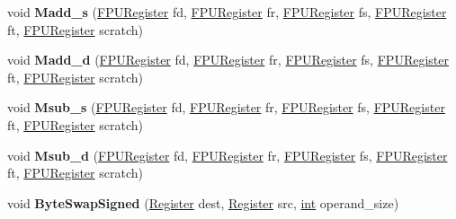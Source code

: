 \begin{DoxyCompactItemize}
void {\bfseries Madd\+\_\+s} (\mbox{\hyperlink{classv8_1_1internal_1_1FPURegister}{F\+P\+U\+Register}} fd, \mbox{\hyperlink{classv8_1_1internal_1_1FPURegister}{F\+P\+U\+Register}} fr, \mbox{\hyperlink{classv8_1_1internal_1_1FPURegister}{F\+P\+U\+Register}} fs, \mbox{\hyperlink{classv8_1_1internal_1_1FPURegister}{F\+P\+U\+Register}} ft, \mbox{\hyperlink{classv8_1_1internal_1_1FPURegister}{F\+P\+U\+Register}} scratch)
\item 
\mbox{\label{classv8_1_1internal_1_1TurboAssembler_a2dcf753d42d05104e154446ae83acad6}} 
void {\bfseries Madd\+\_\+d} (\mbox{\hyperlink{classv8_1_1internal_1_1FPURegister}{F\+P\+U\+Register}} fd, \mbox{\hyperlink{classv8_1_1internal_1_1FPURegister}{F\+P\+U\+Register}} fr, \mbox{\hyperlink{classv8_1_1internal_1_1FPURegister}{F\+P\+U\+Register}} fs, \mbox{\hyperlink{classv8_1_1internal_1_1FPURegister}{F\+P\+U\+Register}} ft, \mbox{\hyperlink{classv8_1_1internal_1_1FPURegister}{F\+P\+U\+Register}} scratch)
\item 
\mbox{\label{classv8_1_1internal_1_1TurboAssembler_a90ee730cab869be9b9218204a094eceb}} 
void {\bfseries Msub\+\_\+s} (\mbox{\hyperlink{classv8_1_1internal_1_1FPURegister}{F\+P\+U\+Register}} fd, \mbox{\hyperlink{classv8_1_1internal_1_1FPURegister}{F\+P\+U\+Register}} fr, \mbox{\hyperlink{classv8_1_1internal_1_1FPURegister}{F\+P\+U\+Register}} fs, \mbox{\hyperlink{classv8_1_1internal_1_1FPURegister}{F\+P\+U\+Register}} ft, \mbox{\hyperlink{classv8_1_1internal_1_1FPURegister}{F\+P\+U\+Register}} scratch)
\item 
\mbox{\label{classv8_1_1internal_1_1TurboAssembler_a0e489c5995084a29bb963a6cb4cff25b}} 
void {\bfseries Msub\+\_\+d} (\mbox{\hyperlink{classv8_1_1internal_1_1FPURegister}{F\+P\+U\+Register}} fd, \mbox{\hyperlink{classv8_1_1internal_1_1FPURegister}{F\+P\+U\+Register}} fr, \mbox{\hyperlink{classv8_1_1internal_1_1FPURegister}{F\+P\+U\+Register}} fs, \mbox{\hyperlink{classv8_1_1internal_1_1FPURegister}{F\+P\+U\+Register}} ft, \mbox{\hyperlink{classv8_1_1internal_1_1FPURegister}{F\+P\+U\+Register}} scratch)
\item 
\mbox{\label{classv8_1_1internal_1_1TurboAssembler_a14e1713113b74964a132172b20697b27}} 
void {\bfseries Byte\+Swap\+Signed} (\mbox{\hyperlink{classv8_1_1internal_1_1Register}{Register}} dest, \mbox{\hyperlink{classv8_1_1internal_1_1Register}{Register}} src, \mbox{\hyperlink{classint}{int}} operand\+\_\+size)

\end{DoxyCompactItemize}
